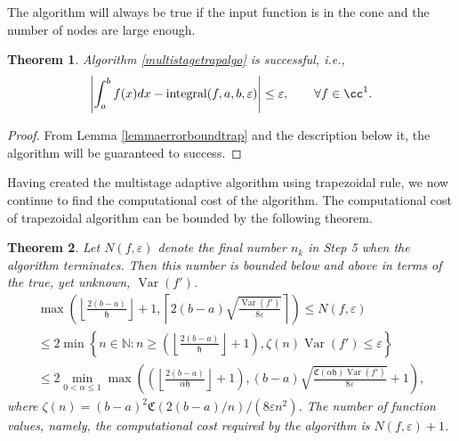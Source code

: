\documentclass{iitthesis}
\DeclareMathOperator{\Var}{Var}
\newtheorem{theorem}{Theorem}
\theoremstyle{definition}
\theoremstyle{remark}
\begin{document}
The algorithm will always be true if the input function is in the cone and the number of nodes are large enough.
\begin{theorem}\label{thmTrap}
    Algorithm \ref{multistagetrapalgo} is successful, i.e.,
    \begin{equation*}
      \left|\int_{a}^{b}f(x)dx-\textup{integral}(f,a,b,\varepsilon)\right|\le\varepsilon, \qquad \forall f\in \cc^1.
    \end{equation*}
\end{theorem}
\begin{proof}
  From Lemma \ref{lemmaerrorboundtrap} and the description below it, the algorithm will be guaranteed to success.
\end{proof}


Having created the multistage adaptive algorithm using trapezoidal rule, we now continue to find the computational cost of the algorithm. The computational cost of trapezoidal algorithm can be bounded by the following theorem.
\begin{theorem}\label{uppbndcosttrap}
    Let $N(f,\varepsilon)$ denote the final number $n_k$ in Step 5 when the algorithm terminates. Then this number is bounded below and above in terms of the true, yet unknown, $\Var(f')$.
    \begin{multline}\label{uppbndcosttrapineq}
        \max\left(\left\lfloor\frac{2(b-a)}{\mathfrak{h}}\right\rfloor+1,\left\lceil2(b-a)\sqrt{\frac{\Var(f')}{8\varepsilon}}\right\rceil\right)\leq N(f,\varepsilon)\\ \leq 2\min\left\{n\in\mathbb{N}:n\geq\left(\left\lfloor\frac{2(b-a)}{\mathfrak{h}}\right\rfloor+1\right),\zeta(n)\Var(f')\leq\varepsilon\right\}\\ \leq 2\min_{0<\alpha\leq1}\max\left(\left(\left\lfloor\frac{2(b-a)}{\alpha\mathfrak{h}}\right\rfloor+1\right),(b-a)\sqrt{\frac{\mathfrak{C}(\alpha\mathfrak{h})\Var(f')}{8\varepsilon}}+1\right),
    \end{multline}
    where $\zeta(n)=(b-a)^2\mathfrak{C}(2(b-a)/n)/(8\varepsilon n^2)$. The number of function values, namely, the computational cost required by the algorithm is $N(f,\varepsilon)+1$.
\end{theorem}
\end{document}
